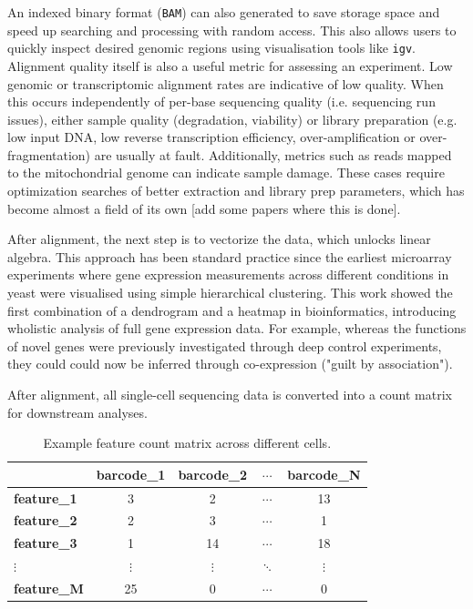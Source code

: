 An indexed binary format (\verb|BAM|) can also generated to save storage space and speed up searching and processing with random access. This also allows users to quickly inspect desired genomic regions using visualisation tools like \verb|igv|. Alignment quality itself is also a useful metric for assessing an experiment. Low genomic or transcriptomic alignment rates are indicative of low quality. When this occurs independently of per-base sequencing quality (i.e. sequencing run issues), either sample quality (degradation, viability) or library preparation (e.g. low input DNA, low reverse transcription efficiency, over-amplification or over-fragmentation) are usually at fault. Additionally, metrics such as reads mapped to the mitochondrial genome can indicate sample damage. These cases require optimization searches of better extraction and library prep parameters, which has become almost a field of its own [add some papers where this is done].


After alignment, the next step is to vectorize the data, which unlocks linear algebra. This approach has been standard practice since the earliest microarray experiments where gene expression measurements across different conditions in yeast were visualised using simple hierarchical clustering. This work showed the first combination of a dendrogram and a heatmap in bioinformatics, introducing wholistic analysis of full gene expression data. For example, whereas the functions of novel genes were previously investigated through deep control experiments, they could could now be inferred through co-expression ("guilt by association").

After alignment, all single-cell sequencing data is converted into a count matrix for downstream analyses.

\begin{table}[ht]
	\centering
	\begin{tabular}{lcccc}
		\hline
		                    & \textbf{barcode\_1} & \textbf{barcode\_2} & $\cdots$ & \textbf{barcode\_N} \\ \hline
		\textbf{feature\_1} & 3                   & 2                   & $\cdots$ & 13                  \\
		\textbf{feature\_2} & 2                   & 3                   & $\cdots$ & 1                   \\
		\textbf{feature\_3} & 1                   & 14                  & $\cdots$ & 18                  \\
		$\vdots$            & $\vdots$            & $\vdots$            & $\ddots$ & $\vdots$            \\
		\textbf{feature\_M} & 25                  & 0                   & $\cdots$ & 0                   \\ \hline
	\end{tabular}
	\caption{Example feature count matrix across different cells.}
	\label{tab:feature_count_matrix}
\end{table}


